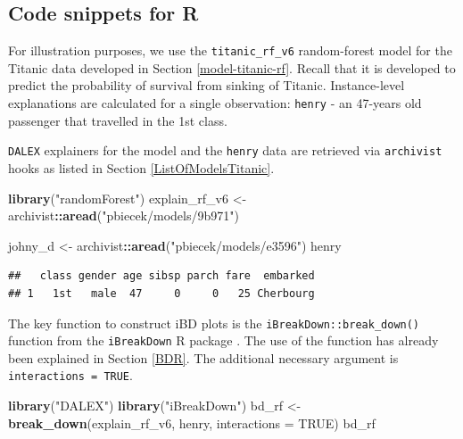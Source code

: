 \documentclass[12pt,]{krantz}
\newenvironment{Shaded}{\begin{snugshade}}{\end{snugshade}}
\newcommand{\DataTypeTok}[1]{\textcolor[rgb]{0.13,0.29,0.53}{#1}}
\newcommand{\KeywordTok}[1]{\textcolor[rgb]{0.13,0.29,0.53}{\textbf{#1}}}
\newcommand{\NormalTok}[1]{#1}
\newcommand{\OperatorTok}[1]{\textcolor[rgb]{0.81,0.36,0.00}{\textbf{#1}}}
\newcommand{\OtherTok}[1]{\textcolor[rgb]{0.56,0.35,0.01}{#1}}
\newcommand{\StringTok}[1]{\textcolor[rgb]{0.31,0.60,0.02}{#1}}
\begin{document}
\hypertarget{iBDRcode}{%
\subsection{Code snippets for R}\label{iBDRcode}}

For illustration purposes, we use the \texttt{titanic\_rf\_v6} random-forest model for the Titanic data developed in Section \ref{model-titanic-rf}. Recall that it is developed to predict the probability of survival from sinking of Titanic. Instance-level explanations are calculated for a single observation: \texttt{henry} - an 47-years old passenger that travelled in the 1st class.

\texttt{DALEX} explainers for the model and the \texttt{henry} data are retrieved via \texttt{archivist} hooks as listed in Section \ref{ListOfModelsTitanic}.

\begin{Shaded}
\begin{Highlighting}[]
\KeywordTok{library}\NormalTok{(}\StringTok{"randomForest"}\NormalTok{)}
\NormalTok{explain_rf_v6 <-}\StringTok{ }\NormalTok{archivist}\OperatorTok{::}\KeywordTok{aread}\NormalTok{(}\StringTok{"pbiecek/models/9b971"}\NormalTok{)}

\NormalTok{johny_d <-}\StringTok{ }\NormalTok{archivist}\OperatorTok{::}\KeywordTok{aread}\NormalTok{(}\StringTok{"pbiecek/models/e3596"}\NormalTok{)}
\NormalTok{henry}
\end{Highlighting}
\end{Shaded}

\begin{verbatim}
##   class gender age sibsp parch fare  embarked
## 1   1st   male  47     0     0   25 Cherbourg
\end{verbatim}

The key function to construct iBD plots is the \texttt{iBreakDown::break\_down()} function from the \texttt{iBreakDown} R package \citep{iBreakDownRPackage}. The use of the function has already been explained in Section \ref{BDR}. The additional necessary argument is \texttt{interactions\ =\ TRUE}.

\begin{Shaded}
\begin{Highlighting}[]
\KeywordTok{library}\NormalTok{(}\StringTok{"DALEX"}\NormalTok{)}
\KeywordTok{library}\NormalTok{(}\StringTok{"iBreakDown"}\NormalTok{)}
\NormalTok{bd_rf <-}\StringTok{ }\KeywordTok{break_down}\NormalTok{(explain_rf_v6, henry, }\DataTypeTok{interactions =} \OtherTok{TRUE}\NormalTok{)}
\NormalTok{bd_rf}
\end{Highlighting}
\end{Shaded}
\end{document}
